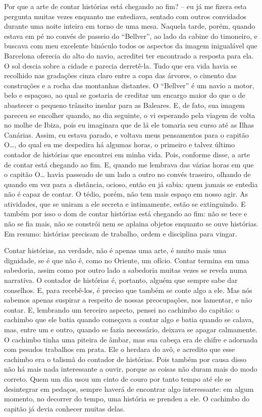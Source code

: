 Por que a arte de contar histórias está chegando ao fim? -- eu já me
fizera esta pergunta muitas vezes enquanto me entediava, sentado com
outros convidados durante uma noite inteira em torno de uma mesa.
Naquela tarde, porém, quando estava em pé no convés de passeio do
``Bellver'', ao lado da cabine do timoneiro, e buscava com meu excelente
binóculo todos os aspectos da imagem inigualável que Barcelona oferecia
do alto do navio, acreditei ter encontrado a resposta para ela. O sol
descia sobre a cidade e parecia derretê-la. Tudo que era vida havia se
recolhido nas gradações cinza claro entre a copa das árvores, o cimento
das construções e a rocha das montanhas distantes. O ``Bellver'' é um
navio a motor, belo e espaçoso, ao qual se gostaria de creditar um
encargo maior do que o de abastecer o pequeno trânsito insular para as
Baleares. E, de fato, sua imagem pareceu se encolher quando, no dia
seguinte, o vi esperando pela viagem de volta no molhe de Ibiza, pois eu
imaginara que de lá ele tomaria seu curso até as Ilhas Canárias. Assim,
eu estava parado, e voltava meus pensamentos para o capitão O\ldots{}, do
qual eu me despedira há algumas horas, o primeiro e talvez último
contador de histórias que encontrei em minha vida. Pois, conforme disse,
a arte de contar está chegando ao fim. E, quando me lembrava das várias
horas em que o capitão O\ldots{} havia passeado de um lado a outro no convés
traseiro, olhando de quando em vez para a distância, ocioso, então eu já
sabia: quem jamais se entedia não é capaz de contar. O tédio, porém, não
tem mais espaço em nosso agir. As atividades, que se uniram a ele
secreta e intimamente, estão se extinguindo. E também por isso o dom de
contar histórias está chegando ao fim: não se tece e não se fia mais,
não se constrói nem se aplaina objetos enquanto se ouve histórias. Em
resumo: histórias precisam de trabalho, ordem e disciplina para vingar.

Contar histórias, na verdade, não é apenas uma arte, é muito mais uma
dignidade, se é que não é, como no Oriente, um ofício. Contar termina em
uma sabedoria, assim como por outro lado a sabedoria muitas vezes se
revela numa narrativa. O contador de histórias é, portanto, alguém que
sempre sabe dar conselhos. E, para recebê-los, é preciso que também se
conte algo a ele. Mas nós sabemos apenas suspirar a respeito de nossas
preocupações, nos lamentar, e não contar. E, lembrando um terceiro
aspecto, pensei no cachimbo do capitão: o cachimbo que ele batia quando
começava a contar algo e batia quando se calava, mas, entre um e outro,
quando se fazia necessário, deixava se apagar calmamente. O cachimbo
tinha uma piteira de âmbar, mas sua cabeça era de chifre e adornada com
pesados trabalhos em prata. Ele o herdara do avô, e acredito que esse
cachimbo era o talismã do contador de histórias. Pois também por causa
disso não há mais nada interessante a ouvir, porque as coisas não duram
mais do modo correto. Quem um dia usou um cinto de couro por tanto tempo
até ele se desintegrar em pedaços, sempre haverá de encontrar algo
interessante: em algum momento, no decorrer do tempo, uma história se
prendeu a ele. O cachimbo do capitão já devia conhecer muitas delas.

